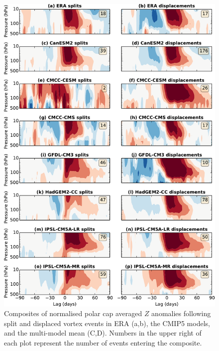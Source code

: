 \begin{figure}
 \centering
 \noindent\includegraphics[width=\textwidth]{figures/chapter-models/dripping_paint1.pdf}
 \caption[NAM composites for splits and displacements in the CMIP5
 models]{Composites of normalised polar cap averaged $Z$ anomalies following
   split and displaced vortex events in ERA (a,b), the CMIP5 models, and the
   multi-model mean (C,D). Numbers in the upper right of each plot represent the
   number of events entering the composite.}
 \label{Fig2}
\end{figure}

